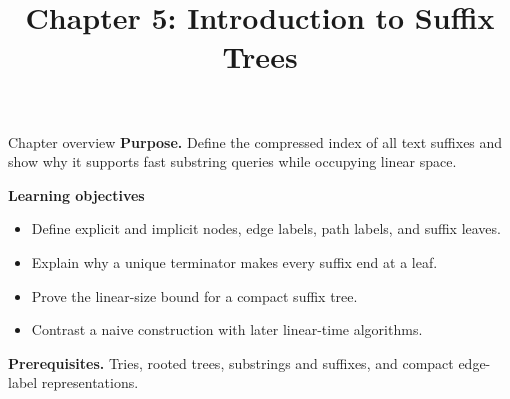 \documentclass[11pt,letterpaper]{article}
\title{Chapter 5: Introduction to Suffix Trees}
\author{}
\date{}
\begin{document}
\maketitle

\begin{CornellOverviewBox}{Chapter overview}
\textbf{Purpose.} Define the compressed index of all text suffixes and show why it supports fast substring queries while occupying linear space.

\textbf{Learning objectives}
\begin{itemize}
  \item Define explicit and implicit nodes, edge labels, path labels, and suffix leaves.
  \item Explain why a unique terminator makes every suffix end at a leaf.
  \item Prove the linear-size bound for a compact suffix tree.
  \item Contrast a naive construction with later linear-time algorithms.
\end{itemize}

\textbf{Prerequisites.} Tries, rooted trees, substrings and suffixes, and compact edge-label representations.
\end{CornellOverviewBox}
\end{document}
